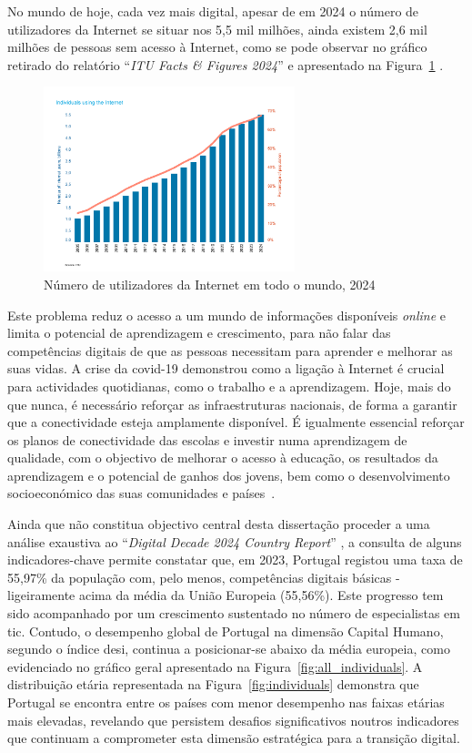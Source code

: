 No mundo de hoje, cada vez mais digital, apesar de em 2024 o número de utilizadores da Internet se situar nos 5,5 mil milhões, ainda existem 2,6 mil milhões de pessoas sem acesso à Internet, como se pode observar no gráfico retirado do relatório ``\textit{ITU Facts \& Figures 2024}'' e apresentado na Figura~\ref{fig:numutilizadoresnet} \cite{broadbandcomission, itu2024facts}.

\begin{figure}[hbtp]
    \centering
    \includegraphics[width=0.65\textwidth]{figures/ITU-InternetUse.png}
    \caption{Número de utilizadores da Internet em todo o mundo, 2024 \cite{itu2024facts}}
    \label{fig:numutilizadoresnet}
\end{figure}
Este problema reduz o acesso a um mundo de informações disponíveis \textit{online} e limita o potencial de aprendizagem e crescimento, para não falar das competências digitais de que as pessoas necessitam para aprender e melhorar as suas vidas.
A crise da \acrshort{covid-19} demonstrou como a ligação à Internet é crucial para actividades quotidianas, como o trabalho e a aprendizagem. Hoje, mais do que nunca, é necessário reforçar as infraestruturas nacionais, de forma a garantir que a conectividade esteja amplamente disponível. É igualmente essencial reforçar os planos de conectividade das escolas e investir numa aprendizagem de qualidade, com o objectivo de melhorar o acesso à educação, os resultados da aprendizagem e o potencial de ganhos dos jovens, bem como o desenvolvimento socioeconómico das suas comunidades e países~\cite{TheDigitransf}.

Ainda que não constitua objectivo central desta dissertação proceder a uma análise exaustiva ao ``\textit{Digital Decade 2024 Country Report}'' \cite{DESI2024}, a consulta de alguns indicadores-chave permite constatar que, em 2023, Portugal registou uma taxa de 55,97\% da população com, pelo menos, competências digitais básicas - ligeiramente acima da média da União Europeia (55,56\%). Este progresso tem sido acompanhado por um crescimento sustentado no número de especialistas em \acrfull{tic}.
Contudo, o desempenho global de Portugal na dimensão Capital Humano, segundo o índice \acrfull{desi}, continua a posicionar-se abaixo da média europeia, como evidenciado no gráfico geral apresentado na Figura~\ref{fig:all_individuals}. A distribuição etária representada na Figura~\ref{fig:individuals} demonstra que Portugal se encontra entre os países com menor desempenho nas faixas etárias mais elevadas, revelando que persistem desafios significativos noutros indicadores que continuam a comprometer esta dimensão estratégica para a transição digital.

